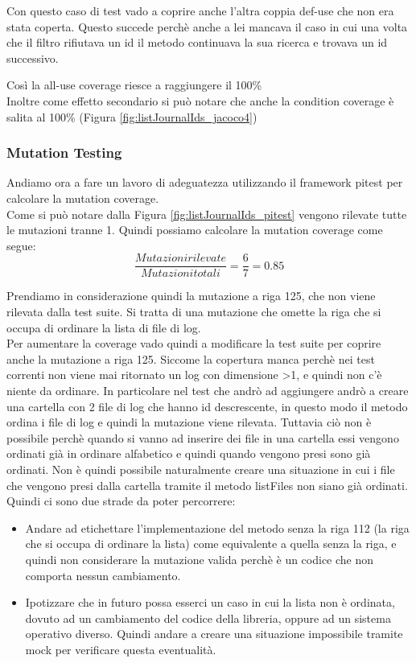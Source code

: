 \documentclass[12pt, a4paper]{article}
\begin{document}
Con questo caso di test vado a coprire anche l'altra coppia def-use che non era stata coperta.
Questo succede perchè anche a lei mancava il caso in cui una volta che il filtro rifiutava un id il
metodo continuava la sua ricerca e trovava un id successivo.

Così la all-use coverage riesce a raggiungere il 100\% \\ 

Inoltre come effetto secondario si può notare che anche
la condition coverage è salita al 100\% (Figura \ref{fig:listJournalIds_jacoco4})

\subsubsection{Mutation Testing}
Andiamo ora a fare un lavoro di adeguatezza utilizzando il framework pitest per calcolare la mutation coverage. \\
Come si può notare dalla Figura \ref{fig:listJournalIds_pitest} vengono rilevate tutte le mutazioni tranne 1.
Quindi possiamo calcolare la mutation coverage come segue:
\[\frac{{Mutazioni rilevate}}{{Mutazioni totali}} = \frac{{6}}{{7}} = 0.85\]

Prendiamo in considerazione quindi la mutazione a riga 125, che non viene rilevata dalla test suite. Si tratta 
di una mutazione che omette la riga che si occupa di ordinare la lista di file di log. \\

Per aumentare la coverage vado quindi a modificare la test suite per coprire anche la mutazione a riga 125.
Siccome la copertura manca perchè nei test correnti non viene mai ritornato un log con dimensione >1, e 
quindi non c'è niente da ordinare. In particolare nel test che andrò ad aggiungere andrò a creare una cartella con 2 file
di log che hanno id descrescente, in questo modo il metodo ordina i file di log e quindi la mutazione viene rilevata.
Tuttavia ciò non è possibile perchè quando si vanno ad inserire dei file in una cartella essi vengono ordinati già in ordinare
alfabetico e quindi quando vengono presi sono già ordinati. Non è quindi possibile naturalmente creare una situazione 
in cui i file che vengono presi dalla cartella tramite il metodo listFiles\(\) non siano già ordinati. \\
Quindi ci sono due strade da poter percorrere:
\begin{itemize}
  \item Andare ad etichettare l'implementazione del metodo senza la riga 112 (la riga che si occupa di ordinare la lista) 
  come equivalente a quella senza la riga, e quindi non considerare la mutazione valida perchè è un codice che non
  comporta nessun cambiamento.
  \item Ipotizzare che in futuro possa esserci un caso in cui la lista non è ordinata, dovuto ad un cambiamento del codice
  della libreria, oppure ad un sistema operativo diverso. Quindi andare a creare una situazione impossibile tramite mock per
  verificare questa eventualità.
\end{itemize}
\end{document}
